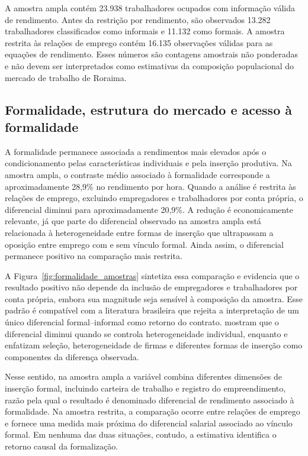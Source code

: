 \documentclass[12pt]{article}
\begin{document}
A amostra ampla contém 23.938 trabalhadores ocupados com informação válida de
rendimento. Antes da restrição por rendimento, são observados 13.282
trabalhadores classificados como informais e 11.132 como formais. A amostra
restrita às relações de emprego contém 16.135 observações válidas para as
equações de rendimento. Esses números são contagens amostrais não ponderadas e
não devem ser interpretados como estimativas da composição populacional do
mercado de trabalho de Roraima.

\subsection{Formalidade, estrutura do mercado e acesso à formalidade}
\label{subsec:resultados_formalidade}

A formalidade permanece associada a rendimentos mais elevados após o
condicionamento pelas características individuais e pela inserção produtiva.
Na amostra ampla, o contraste médio associado à formalidade corresponde a
aproximadamente 28,9\% no rendimento por hora. Quando a análise é restrita às
relações de emprego, excluindo empregadores e trabalhadores por conta própria,
o diferencial diminui para aproximadamente 20,9\%. A redução é economicamente
relevante, já que parte do diferencial observado na amostra ampla está relacionada à
heterogeneidade entre formas de inserção que ultrapassam a oposição entre
emprego com e sem vínculo formal. Ainda assim, o diferencial permanece positivo
na comparação mais restrita.

A Figura~\ref{fig:formalidade_amostras} sintetiza essa comparação e evidencia
que o resultado positivo não depende da inclusão de empregadores e
trabalhadores por conta própria, embora sua magnitude seja sensível à composição
da amostra. Esse padrão é compatível com a literatura brasileira que rejeita a
interpretação de um único diferencial formal--informal como retorno do contrato.
\citet{curi2006} mostram que o diferencial diminui quando se controla
heterogeneidade individual, enquanto \citet{meghir2015} e \citet{ulyssea2018}
enfatizam seleção, heterogeneidade de firmas e diferentes formas de inserção
como componentes da diferença observada.

Nesse sentido, na amostra ampla a variável combina diferentes dimensões de
inserção formal, incluindo carteira de trabalho e registro do empreendimento,
razão pela qual o resultado é denominado diferencial de rendimento associado à
formalidade. Na amostra restrita, a comparação ocorre entre relações de emprego
e fornece uma medida mais próxima do diferencial salarial associado ao vínculo
formal. Em nenhuma das duas situações, contudo, a estimativa identifica o
retorno causal da formalização.
\end{document}
